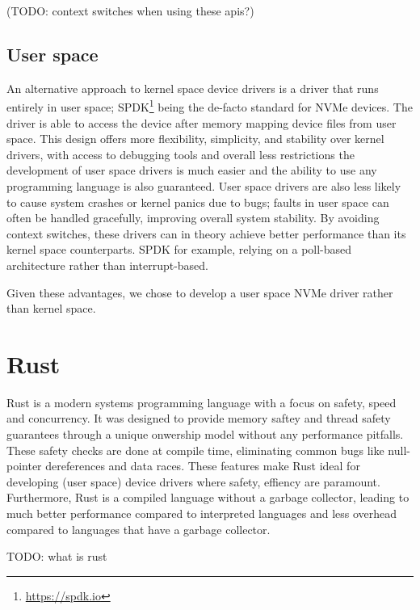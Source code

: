 (TODO: context switches when using these apis?)

\subsection{User space}
An alternative approach to kernel space device drivers is a driver that runs entirely in user space; SPDK\footnote{\url{https://spdk.io}} being the de-facto standard for NVMe devices. The driver is able to access the device after memory mapping device files from user space. This design offers more flexibility, simplicity, and stability over kernel drivers, with access to debugging tools and overall less restrictions the development of user space drivers is much easier and the ability to use any programming language is also guaranteed. User space drivers are also less likely to cause system crashes or kernel panics due to bugs; faults in user space can often be handled gracefully, improving overall system stability. By avoiding context switches, these drivers can in theory achieve better performance than its kernel space counterparts. SPDK for example, relying on a poll-based architecture rather than interrupt-based.

Given these advantages, we chose to develop a user space NVMe driver rather than kernel space.

\section{Rust}

Rust is a modern systems programming language with a focus on safety, speed and concurrency. It was designed to provide memory saftey and thread safety guarantees through a unique onwership model without any performance pitfalls. These safety checks are done at compile time, eliminating common bugs like null-pointer dereferences and data races. These features make Rust ideal for developing (user space) device drivers where safety, effiency are paramount. Furthermore, Rust is a compiled language without a garbage collector, leading to much better performance compared to interpreted languages and less overhead compared to languages that have a garbage collector.


TODO: what is rust
